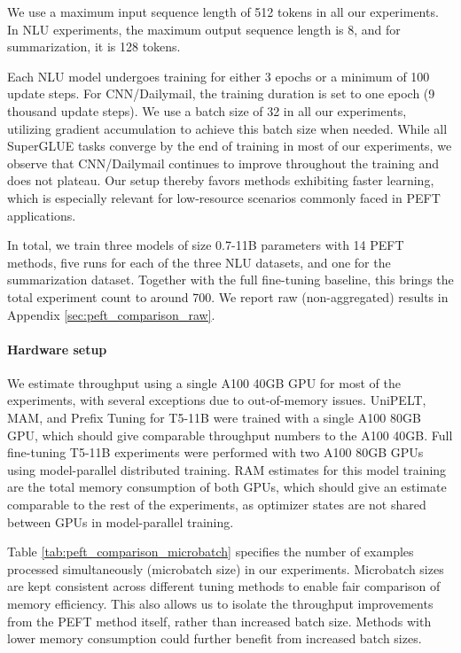 We use a maximum input sequence length of 512 tokens in all our experiments. In NLU experiments, the maximum output sequence length is 8, and for summarization, it is 128 tokens.

Each NLU model undergoes training for either 3 epochs or a minimum of 100 update steps. For CNN/Dailymail, the training duration is set to one epoch (9 thousand update steps). We use a batch size of 32 in all our experiments, utilizing gradient accumulation to achieve this batch size when needed. While all SuperGLUE tasks converge by the end of training in most of our experiments, we observe that CNN/Dailymail continues to improve throughout the training and does not plateau. Our setup thereby favors methods exhibiting faster learning, which is especially relevant for low-resource scenarios commonly faced in PEFT applications.

In total, we train three models of size 0.7-11B parameters with 14 PEFT methods, five runs for each of the three NLU datasets, and one for the summarization dataset. Together with the full fine-tuning baseline, this brings the total experiment count to around 700. We report raw (non-aggregated) results in Appendix \ref{sec:peft_comparison_raw}.

\paragraph{Hardware setup} We estimate throughput using a single A100 40GB GPU for most of the experiments, with several exceptions due to out-of-memory issues. UniPELT, MAM, and Prefix Tuning for T5-11B were trained with a single A100 80GB GPU, which should give comparable throughput numbers to the A100 40GB. Full fine-tuning T5-11B experiments were performed with two A100 80GB GPUs using model-parallel distributed training. RAM estimates for this model training are the total memory consumption of both GPUs, which should give an estimate comparable to the rest of the experiments, as optimizer states are not shared between GPUs in model-parallel training.

Table \ref{tab:peft_comparison_microbatch} specifies the number of examples processed simultaneously (microbatch size) in our experiments. Microbatch sizes are kept consistent across different tuning methods to enable fair comparison of memory efficiency. This also allows us to isolate the throughput improvements from the PEFT method itself, rather than increased batch size. Methods with lower memory consumption could further benefit from increased batch sizes.

